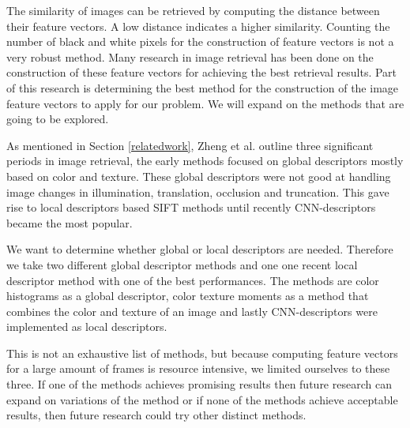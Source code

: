 \documentclass{article}
\begin{document}
The similarity of images can be retrieved by computing the distance between their feature vectors. A low distance indicates a higher similarity. Counting the number of black and white pixels for the construction of feature vectors is not a very robust method. Many research in image retrieval has been done on the construction of these feature vectors for achieving the best retrieval results. Part of this research is determining the best method for the construction of the image feature vectors to apply for our problem. We will expand on the methods that are going to be explored. 

As mentioned in Section \ref{relatedwork}, Zheng et al. \cite{zheng2018sift} outline three significant periods in image retrieval, the early methods focused on global descriptors mostly based on color and texture. These global descriptors were not good at handling image changes in illumination, translation, occlusion and truncation. This gave rise to local descriptors based SIFT methods until recently CNN-descriptors became the most popular. 

We want to determine whether global or local descriptors are needed. Therefore we take two different global descriptor methods and one one recent local descriptor method with one of the best performances. The methods are color histograms as a global descriptor, color texture moments \cite{yu2002colortexturemoments} as a method that combines the color and texture of an image and lastly CNN-descriptors were implemented as local descriptors.

This is not an exhaustive list of methods, but because computing feature vectors for a large amount of frames is resource intensive, we limited ourselves to these three. If one of the methods achieves promising results then future research can expand on variations of the method or if none of the methods achieve acceptable results, then future research could try other distinct methods.
\end{document}
